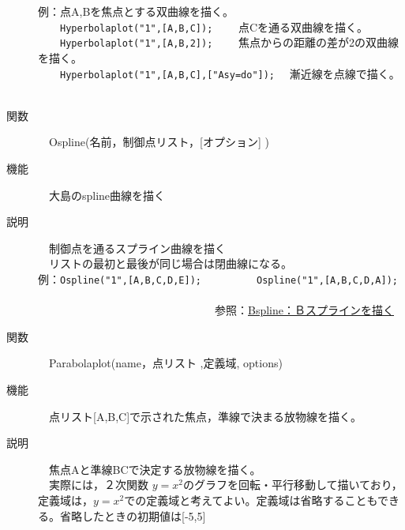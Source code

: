 \documentclass[papersize,a4paper,12pt,uplatex]{jsarticle}
\begin{document}
\begin{description}
例：点A,Bを焦点とする双曲線を描く。\\
　　\verb|Hyperbolaplot("1",[A,B,C]);| 　　点Cを通る双曲線を描く。\\
　　\verb|Hyperbolaplot("1",[A,B,2]);|  　　焦点からの距離の差が2の双曲線を描く。\\
　　\verb|Hyperbolaplot("1",[A,B,C],["Asy=do"]);| 　漸近線を点線で描く。\\

　　　　　\\

\hypertarget{ospline}{}
\item[関数]　Ospline(名前，制御点リスト，[オプション] )
\item[機能]　大島のspline曲線を描く
\item[説明]　制御点を通るスプライン曲線を描く\\
　リストの最初と最後が同じ場合は閉曲線になる。\\


例：\verb|Ospline("1",[A,B,C,D,E]);|　　　　　\verb|Ospline("1",[A,B,C,D,A]);|\\
　　　　　　　
　\\
　　　　　　　　　　　　　　　　参照：\hyperlink{bspline}{Bspline：Ｂスプラインを描く} \\

\hypertarget{parabolaplot}{}
\item[関数]　Parabolaplot(name，点リスト ,定義域, options)
\item[機能]　点リスト[A,B,C]で示された焦点，準線で決まる放物線を描く。
\item[説明]　焦点Aと準線BCで決定する放物線を描く。\\
　実際には，２次関数 $y=x^2$のグラフを回転・平行移動して描いており，定義域は，$y=x^2$での定義域と考えてよい。定義域は省略することもできる。省略したときの初期値は[-5,5]\\


\end{description}
\end{document}
